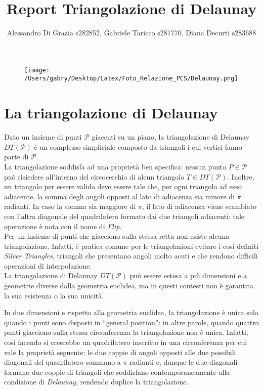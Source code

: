 \documentclass{article}
\title{Report Triangolazione di Delaunay}
\author{Alessandro Di Grazia s282852,  Gabriele Taricco s281770, Diana Decurti s283688}
\date{}
\begin{document}
\begin{figure}
	\centering
	\texttt{[image: /Users/gabry/Desktop/Latex/Foto\_Relazione\_PCS/Delaunay.png]}

\end{figure}
\maketitle
\newpage
\tableofcontents

\newpage
\section{La triangolazione di Delaunay}
Dato un insieme di punti $\mathcal{P}$ giacenti su un piano,  la triangolazione di Delaunay $DT(\mathcal{P})$ è un complesso simpliciale composto da triangoli i cui vertici fanno parte di $\mathcal{P}$.  \\
La triangolazione soddisfa ad una proprietà ben specifica: nessun punto $P \in \mathcal{P}$ può risiedere all'interno del circocerchio di alcun triangolo $T \in DT(\mathcal{P})$.  Inoltre,  un triangolo per essere valido deve essere tale che,  per ogni triangolo ad esso adiacente,  la somma degli angoli opposti al lato di adiacenza sia minore di $\pi$ radianti.  In caso la somma sia maggiore di $\pi$,  il lato di adiacenza viene scambiato con l'altra diagonale del quadrilatero formato dai due triangoli adiacenti: tale operazione è nota con il nome di \emph{Flip}.\\
\indent Per un insieme di punti che giacciono sulla stessa retta non esiste alcuna triangolazione.  Infatti,  è pratica comune per le triangolazioni evitare i così definiti \emph{Silver Triangles},  triangoli che presentano angoli molto acuti e che rendono difficili operazioni di interpolazione. \\
La triangolazione di Delaunay $DT(\mathcal{P})$ può essere estesa a più dimensioni e a geometrie diverse dalla geometria euclidea,  ma in questi contesti non è garantita la sua esistenza o la sua unicità.

In due dimensioni e rispetto alla geometria euclidea,  la triangolazione è unica solo quando i punti sono disposti in \enquote{general position}: in altre parole,  quando quattro punti giacciono sulla stessa circonferenza la triangolazione non è unica.  Infatti,  così facendo si creerebbe un quadrilatero inscritto in una circonferenza per cui vale la proprietà seguente: le due coppie di angoli opposti alle due possibili diagonali del quadrilatero sommano a $\pi$ radianti e,  dunque le due diagonali formano due coppie di triangoli che soddisfano contemporaneamente alla condizione di \emph{Delaunay},  rendendo duplice la triangolazione.
\end{document}
